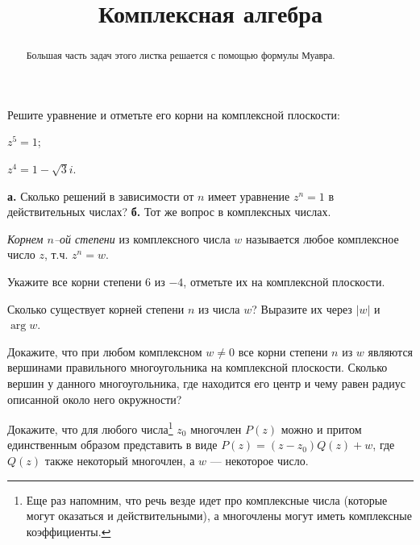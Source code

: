 \documentclass[a4paper, 12pt, num=22]{listok}
\begin{document}
\title{Комплексная алгебра}
\maketitle{}
\begin{abstract}
	Большая часть задач этого листка решается с помощью формулы Муавра.
\end{abstract}
\begin{problem}
	Решите уравнение и отметьте его корни на комплексной плоскости:
	\begin{enumerate}
	\begin{multicols}{2}
		\item $z^5 = 1$;
		\item $z^4 = 1 - \sqrt3i$.
	\end{multicols}
	\end{enumerate}
\end{problem}
\begin{problem}
	\textbf{а.} Сколько решений в зависимости от $n$ имеет уравнение $z^n = 1$ в действительных числах?
	\textbf{б.} Тот же вопрос в комплексных числах.
\end{problem}
\begin{definition}
	\textit{Корнем $n$--ой степени} из комплексного числа $w$ называется любое комплексное число $z$, т.ч. $z^n = w$.
\end{definition}
\begin{problem}
	Укажите все корни степени $6$ из $-4$, отметьте их на комплексной плоскости.
\end{problem}
\begin{problem}
	Сколько существует корней степени $n$ из числа $w$? Выразите их через $|w|$ и $\arg w$.
\end{problem}
\begin{problem}
	Докажите, что при любом комплексном $w \ne 0$ все корни степени $n$ из $w$ являются
	вершинами правильного многоугольника на комплексной плоскости.
	Сколько вершин у данного многоугольника,
	где находится его центр и чему равен радиус описанной около него окружности?
\end{problem}
\begin{problem}
	Докажите, что для любого числа\footnote{Еще раз напомним, что речь везде идет про комплексные числа
	(которые могут оказаться и действительными), а многочлены могут иметь комплексные коэффициенты.}
	$z_0$ многочлен $P(z)$ можно и притом единственным образом представить в виде $P(z) = (z - z_0)Q(z) + w$,
	где $Q(z)$ также некоторый многочлен, а $w$ --- некоторое число.
\end{problem}
\end{document}
